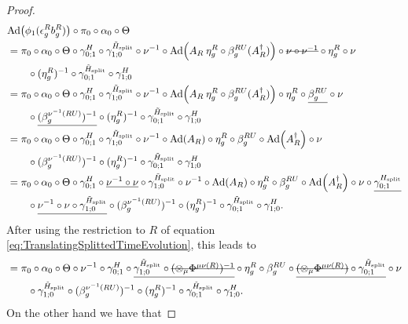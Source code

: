 \documentclass[11pt,a4paper,twoside]{article}
\numberwithin{equation}{section}
\begin{document}
\begin{proof}
	\begin{align}
		&\Ad{\phi_1(\epsilon_g^R b_g^R)}\circ\pi_0\circ\alpha_0\circ\Theta\\
		&=\pi_0\circ\alpha_0\circ\Theta\circ\gamma^H_{0;1}\circ\gamma^{\HsplitTilde}_{1;0}\circ\nu^{-1}\circ\Ad{A_R\: \eta_g^R\circ\beta_g^{RU}(A_R^\dagger)}\circ\stkout{\nu\circ\nu^{-1}}\circ\eta_g^R\circ\nu\\
		\nonumber
		&\qquad\circ(\eta_g^R)^{-1}\circ\gamma^{\HsplitTilde}_{0;1}\circ\gamma^{H}_{1;0}\\
		&=\pi_0\circ\alpha_0\circ\Theta\circ\gamma^H_{0;1}\circ\gamma^{\HsplitTilde}_{1;0}\circ\nu^{-1}\circ\Ad{A_R\: \eta_g^R\circ\beta_g^{RU}(A_R^\dagger)}\circ\eta_g^R\circ\underline{\beta_g^{RU}}\circ\nu\\
		\nonumber
		&\qquad\circ\underline{(\beta_g^{\nu^{-1}(RU)})^{-1}}\circ(\eta_g^R)^{-1}\circ\gamma^{\HsplitTilde}_{0;1}\circ\gamma^{H}_{1;0}\\
		&=\pi_0\circ\alpha_0\circ\Theta\circ\gamma^H_{0;1}\circ\gamma^{\HsplitTilde}_{1;0}\circ\nu^{-1}\circ\Ad{A_R}\circ\eta_g^R\circ\beta_g^{RU}\circ\Ad{A_R^\dagger}\circ\nu\\
		\nonumber
		&\qquad\circ(\beta_g^{\nu^{-1}(RU)})^{-1}\circ(\eta_g^R)^{-1}\circ\gamma^{\HsplitTilde}_{0;1}\circ\gamma^{H}_{1;0}\\
		&=\pi_0\circ\alpha_0\circ\Theta\circ\gamma^H_{0;1}\circ\underline{\nu^{-1}\circ\nu}\circ\gamma^{\HsplitTilde}_{1;0}\circ\nu^{-1}\circ\Ad{A_R}\circ\eta_g^R\circ\beta_g^{RU}\circ\Ad{A_R^\dagger}\circ\nu\circ\underline{\gamma^{\Hsplit}_{0;1}}\\
		\nonumber
		&\qquad \circ\underline{\nu^{-1}\circ\nu\circ\gamma^{\HsplitTilde}_{1;0}}\circ(\beta_g^{\nu^{-1}(RU)})^{-1}\circ(\eta_g^R)^{-1}\circ\gamma^{\HsplitTilde}_{0;1}\circ\gamma^{H}_{1;0}.
	\end{align}
After using the restriction to $R$ of equation \eqref{eq:TranslatingSplittedTimeEvolution}, this leads to
	\begin{align}
		&=\pi_0\circ\alpha_0\circ\Theta\circ\nu^{-1}\circ\gamma^H_{0;1}\circ\underline{\gamma^{\HsplitTilde}_{1;0}\circ\stkout{(\otimes_\mu\Phi^{\mu\nu(R)})^{-1}}}\circ\eta_g^R\circ\beta_g^{RU}\circ\underline{\stkout{(\otimes_\mu\Phi^{\mu\nu(R)})}\circ\gamma^{\HsplitTilde}_{0;1}}\circ\nu\\
		\nonumber
		&\qquad \circ\gamma^{\HsplitTilde}_{1;0}\circ(\beta_g^{\nu^{-1}(RU)})^{-1}\circ(\eta_g^R)^{-1}\circ\gamma^{\HsplitTilde}_{0;1}\circ\gamma^{H}_{1;0}.
	\end{align}
	On the other hand we have that

\end{proof}
\end{document}
